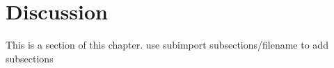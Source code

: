 
\section{Discussion}
This is a section of this chapter.
use subimport {subsections/}{filename} to add subsections
